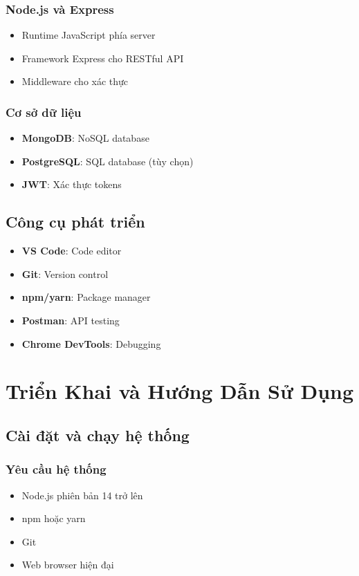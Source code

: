 \documentclass[12pt,a4paper]{report}
\begin{document}
\subsubsection{Node.js và Express}
\begin{itemize}
    \item Runtime JavaScript phía server
    \item Framework Express cho RESTful API
    \item Middleware cho xác thực
\end{itemize}

\subsubsection{Cơ sở dữ liệu}
\begin{itemize}
    \item \textbf{MongoDB}: NoSQL database
    \item \textbf{PostgreSQL}: SQL database (tùy chọn)
    \item \textbf{JWT}: Xác thực tokens
\end{itemize}

\subsection{Công cụ phát triển}

\begin{itemize}
    \item \textbf{VS Code}: Code editor
    \item \textbf{Git}: Version control
    \item \textbf{npm/yarn}: Package manager
    \item \textbf{Postman}: API testing
    \item \textbf{Chrome DevTools}: Debugging
\end{itemize}

\newpage

\section{Triển Khai và Hướng Dẫn Sử Dụng}

\subsection{Cài đặt và chạy hệ thống}

\subsubsection{Yêu cầu hệ thống}
\begin{itemize}
    \item Node.js phiên bản 14 trở lên
    \item npm hoặc yarn
    \item Git
    \item Web browser hiện đại
\end{itemize}
\end{document}
